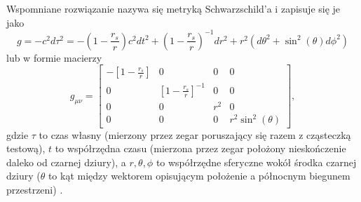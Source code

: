 Wspomniane rozwiązanie nazywa się metryką Schwarzschild'a i zapisuje się je jako
$$g=-c^2d\tau^2=- \left( 1-\frac{r_s}{r}  \right) c^2dt^2 + \left(1-\frac{r_s}{r} \right)^{-1}dr^2 +r^2(d\theta^2+\sin^2(\theta)d\phi^2) $$
lub w formie macierzy
$$g_{\mu\nu}=\begin{bmatrix}
  -\left[1-\frac{r_s}{r}\right] & 0 & 0 & 0\\ 
  0 & \left[1-\frac{r_s}{r}\right]^{-1} & 0 & 0\\ 
  0 & 0 & r^2 & 0\\ 
  0 & 0 & 0 & r^2\sin^2(\theta)
\end{bmatrix},$$ 
gdzie $\tau$ to czas własny (mierzony przez zegar poruszający się razem z cząsteczką testową), $t$ to współrzędna czasu (mierzona przez zegar położony nieskończenie daleko od czarnej dziury), a $r,\theta,\phi$ to współrzędne sferyczne wokół środka czarnej dziury ($\theta$ to kąt między wektorem opisującym położenie a północnym biegunem przestrzeni) \cite{notatkiUoCSD}.





